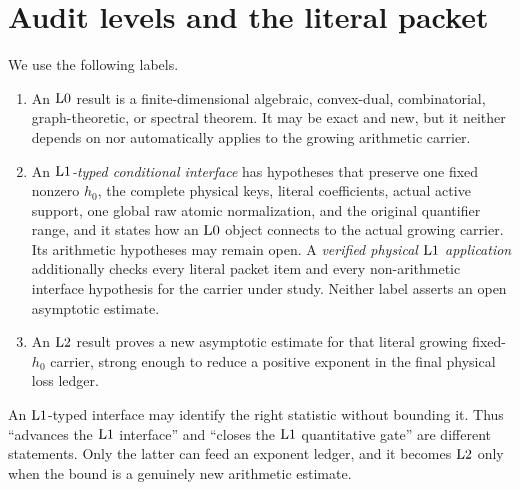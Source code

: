 \section{Audit levels and the literal packet}
\label{sec:audit-levels}

\begin{definition}
\label{def:levels}
We use the following labels.
\begin{enumerate}[label=(\arabic*),leftmargin=2.2em]
\item An \(\mathrm{L0}\) result is a finite-dimensional algebraic,
convex-dual, combinatorial, graph-theoretic, or spectral theorem.  It
may be exact and new, but it neither depends on nor automatically
applies to the growing arithmetic carrier.
\item An \emph{\(\mathrm{L1}\)-typed conditional interface} has hypotheses
that preserve one fixed nonzero \(h_0\), the complete physical keys,
literal coefficients, actual active support, one global raw atomic
normalization, and the original quantifier range, and it states how
an \(\mathrm{L0}\) object connects to the actual growing carrier.  Its
arithmetic hypotheses may remain open.  A \emph{verified physical
\(\mathrm{L1}\) application} additionally checks every literal packet item
and every non-arithmetic interface hypothesis for the carrier under
study.  Neither label asserts an open asymptotic estimate.
\item An \(\mathrm{L2}\) result proves a new asymptotic estimate for that
literal growing fixed-\(h_0\) carrier, strong enough to reduce a
positive exponent in the final physical loss ledger.
\end{enumerate}
\end{definition}

\begin{remark}
An \(\mathrm{L1}\)-typed interface may identify the right statistic without
bounding it.  Thus ``advances the \(\mathrm{L1}\) interface'' and ``closes
the \(\mathrm{L1}\) quantitative gate'' are different statements.  Only the
latter can feed an exponent ledger, and it becomes \(\mathrm{L2}\) only
when the bound is a genuinely new arithmetic estimate.
\end{remark}

